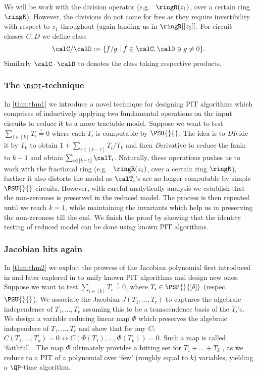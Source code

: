 We will be work with the division operator (e.g.~ $\ringR(z_1)$, over a certain ring $\ringR$). However, the divisions do not come for free as they require invertibility with respect to $z_1$ throughout (again landing us in $\ringR[[z_1]]$. For circuit classes $C, D$ we define class \[\calC/\calD:=\{f/g \mid f\in \calC, \calD \ni g \neq 0\}.\]Similarly $\calC \cdot \calD$ to denotes the class taking respective products.

\subsubsection{The \texorpdfstring{$\DiDI$}{DiDI}-technique} In \autoref{thm:thm1} we introduce a novel technique for designing PIT algorithms which comprises of inductively applying two fundamental operations on the input circuits to reduce it to a more tractable model. Suppose we want to test $\sum_{i \in [k]} T_i \stackrel{?}{=} 0$ where each $T_i$ is computable by $\PSU{}{}$. The idea is to \emph{DI}vide it by $T_k$ to obtain $1 + \sum_{i \in [k-1]} T_i/T_k$ and then {\em D}erivative to reduce the fanin to $k-1$ and obtain $\sum_{i \in [k-1]} \calT_i$. Naturally, these operations pushes us to work with the fractional ring (e.g.~ $\ringR(z_1)$, over a certain ring $\ringR$), further it also distorts the model as $\calT_i$'s are no longer computable by simple $\PSU{}{}$ circuits. However, with careful analytically analysis we establish that the non-zeroness is preserved in the reduced model. The process is then repeated until we reach $k=1$, while maintaining the invariants which help us in preserving the non-zeroness till the end. We finish the proof by showing that the identity testing of reduced model can be done using known PIT algorithms.


\subsubsection{Jacobian hits again} In \autoref{thm:thm2} we exploit the prowess of the Jacobian polynomial first introduced in \cite{beecken2013algebraic} and later explored in \cite{agrawal2016jacobian} to unify known PIT algorithms and design new ones. Suppose we want to test $\sum_{i \in [k]} T_i \stackrel{?}{=} 0$, where $T_i \in \PSP{}{[\delta]}$ (respec.~$\PSU{}{}$). We associate the Jacobian $J(T_1, \hdots, T_r)$ to captures the algebraic independence of $T_1, \hdots, T_r$ assuming this to be a transcendence basis of the $T_i$’s. We design a variable reducing linear map $\Phi$ which preserves the algebraic independece of $T_1, \dots, T_r$ and show that for any $C$: $C(T_1,\hdots, T_k) = 0 \iff C(\Phi(T_1), \hdots, \Phi(T_k)) = 0$. Such a map is called `faithful' \cite{agrawal2016jacobian}. The map $\Phi$ ultimately provides a hitting set for $T_1 + \hdots +T_k$ , as we reduce to a PIT of a polynomial over `few' (roughly equal to $k$) variables, yielding a $\QP$-time algorithm.
